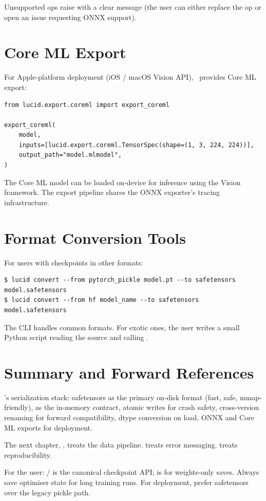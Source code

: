 Unsupported ops raise with a clear message (the user can
either replace the op or open an issue requesting ONNX
support).

\section{Core ML Export}
\label{sec:serialization:coreml}

For Apple-platform deployment (iOS / macOS Vision API),
\Lucid\ provides Core ML export:

\begin{lstlisting}[style=lucid,language=LucidPython]
from lucid.export.coreml import export_coreml

export_coreml(
    model,
    inputs=[lucid.export.coreml.TensorSpec(shape=(1, 3, 224, 224))],
    output_path="model.mlmodel",
)
\end{lstlisting}

The Core ML model can be loaded on-device for inference using
the Vision framework. The export pipeline shares the
ONNX exporter's tracing infrastructure.

\section{Format Conversion Tools}
\label{sec:serialization:format_conversion}

For users with checkpoints in other formats:

\begin{lstlisting}[style=lucid,language=LucidPython]
$ lucid convert --from pytorch_pickle model.pt --to safetensors model.safetensors
$ lucid convert --from hf model_name --to safetensors model.safetensors
\end{lstlisting}

The  CLI handles common formats. For exotic
ones, the user writes a small Python script reading the source
and calling .

\section{Summary and Forward References}
\label{sec:serialization:summary}

\Lucid's serialization stack: safetensors as the primary
on-disk format (fast, safe, mmap-friendly), 
as the in-memory contract, atomic writes for crash safety,
cross-version renaming for forward compatibility, dtype
conversion on load, ONNX and Core ML exports for deployment.

The next chapter, , treats the data
pipeline.  treats error messaging.
 treats reproducibility.

\begin{lucidnote}
For the user:  /  is the
canonical checkpoint API;  is for
weights-only saves. Always save optimiser state for long
training runs. For deployment, prefer safetensors over the
legacy pickle path.
\end{lucidnote}
